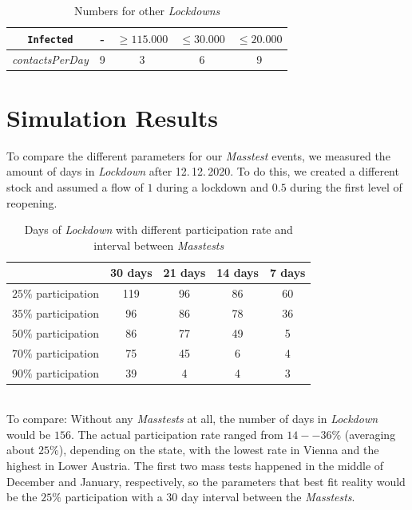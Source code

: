 \documentclass
[
    a4paper,
    11pt,
    bibliography = totoc,
    listof = totoc,
    headinclude = true,
]
{scrreport}
\begin{document}
\begin{table}[!h]
  \begin{center}
  \begin{tabular}{|c||c|c|c|c|}
  \hline
    \texttt{Infected} &- & $\geq 115.000$ & $\leq 30.000$ & $\leq 20.000$ \\
    \hline
    \textit{contactsPerDay} & 9 & 3 & 6 & 9 \\
    \hline
  \end{tabular}
  \end{center}
  \caption{Numbers for other \textit{Lockdowns}}
\end{table}

\chapter{Simulation Results}

To compare the different parameters for our \textit{Masstest} events, we measured the amount of days in \textit{Lockdown} after 12.\,12.\,2020. To do this, we created a different stock and assumed a flow of $1$ during a lockdown and $0.5$ during the first level of reopening.
\begin{table}[!h]
{\small%
\begin{center}
\begin{tabular}{|c||c|c|c|c|}
\hline
& 30 days   & 21 days   & 14 days   & 7 days  \\
 \hline
 \hline
     $25\%$ participation & 119 &96 & 86 & 60\\
 \hline
     $35\%$ participation & 96 &  86&  78  & 36   \\
 \hline
     $50\%$ participation & 86 & 77 & 49 & 5\\
 \hline
     $70\%$ participation & 75 &  45 & 6 & 4 \\
 \hline
     $90\%$ participation & 39 &4 &4  & 3\\
     \hline
\end{tabular}
\end{center}
}

\caption{Days of \textit{Lockdown} with different participation rate and interval between \textit{Masstests}}
\end{table} \\
To compare: Without any \textit{Masstests} at all, the number of days in \textit{Lockdown} would be $156$. The actual participation rate ranged from $14 -- 36\%$ (averaging about $25\%$), depending on the state, with the lowest rate in Vienna and the highest in Lower Austria. The first two mass tests happened in the middle of December and January, respectively, so the parameters that best fit reality would be the $25\%$ participation with a $30$ day interval between the \textit{Masstests}.
\end{document}
